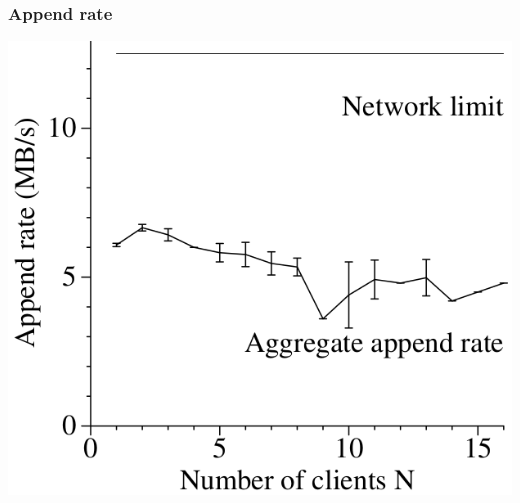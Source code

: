 \documentclass{beamer}
\begin{document}
\begin{frame}
 \frametitle{Append rate}
 \ratemehspace
 \includegraphics[height=\ratemesoption]{figures/GFSappends.png}
\end{frame}
\end{document}
